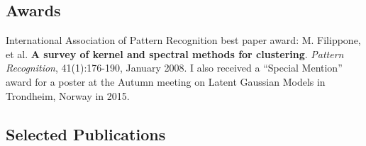 \documentclass[a4paper,10pt]{article}
\begin{document}


\subsection*{Awards}
International Association of Pattern Recognition best paper award: 
       M. Filippone, et al. %
       \textbf{A survey of kernel and spectral methods for clustering}.
       \emph{Pattern Recognition}, 41(1):176-190, January 2008.
%
I also received a ``Special Mention'' award for a poster at the Autumn meeting on Latent Gaussian Models in Trondheim, Norway in 2015. 


\subsection*{Selected Publications}
\end{document}
